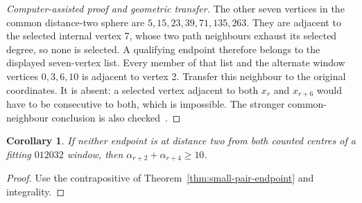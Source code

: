 \documentclass[11pt,a4paper]{article}
\newtheorem{corollary}[theorem]{Corollary}
\theoremstyle{definition}
\theoremstyle{remark}
\begin{document}
\begin{proof}[Computer-assisted proof and geometric transfer]
The other seven vertices in the common distance-two sphere are
$5,15,23,39,71,135,263$. They are adjacent to the selected internal vertex 7,
whose two path neighbours exhaust its selected degree, so none is selected.
A qualifying endpoint therefore belongs to the displayed seven-vertex list.
Every member of that list and the alternate window vertices $0,3,6,10$ is
adjacent to vertex 2. Transfer this neighbour to the original coordinates.
It is absent: a selected vertex adjacent to both $x_r$ and $x_{r+6}$ would
have to be consecutive to both, which is impossible. The stronger
common-neighbour conclusion is also checked~\cite{occurrencearchive}.
\end{proof}

\begin{corollary}\label{cor:pair-ten-without-endpoint}
If neither endpoint is at distance two from both counted centres of a
fitting $012032$ window, then $\alpha_{r+2}+\alpha_{r+4}\ge10$.
\end{corollary}
\begin{proof}
Use the contrapositive of Theorem~\ref{thm:small-pair-endpoint} and integrality.
\end{proof}
\end{document}

